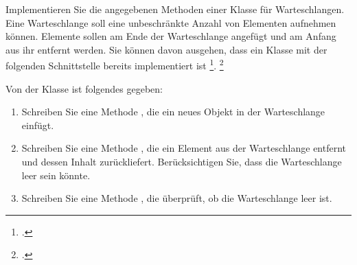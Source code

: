 \documentclass{bschlangaul-aufgabe}
\begin{document}

Implementieren Sie die angegebenen Methoden einer Klasse
 für Warteschlangen. Eine Warteschlange soll eine
unbeschränkte Anzahl von Elementen aufnehmen können. Elemente sollen am
Ende der Warteschlange angefügt und am Anfang aus ihr entfernt werden.
Sie können davon ausgehen, dass ein Klasse  mit
der folgenden Schnittstelle bereits implementiert ist \footcite[Thema 1
Aufgabe 7 Seite 3]{examen:66115:2007:03}.
\footcite[Seite 1-2, Aufgabe 2]{aud:pu:4}


\noindent
Von der Klasse  ist folgendes gegeben:


\begin{enumerate}


\item Schreiben Sie eine Methode ,
die ein neues Objekt in der Warteschlange einfügt.

\begin{bAntwort}
\end{bAntwort}


\item Schreiben Sie eine Methode , die ein
Element aus der Warteschlange entfernt und dessen Inhalt zurückliefert.
Berücksichtigen Sie, dass die Warteschlange leer sein könnte.

\begin{bAntwort}
\end{bAntwort}


\item Schreiben Sie eine Methode , die
überprüft, ob die Warteschlange leer ist.

\begin{bAntwort}
\end{bAntwort}

\end{enumerate}




\end{document}
